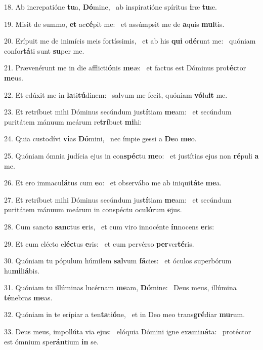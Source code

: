 18. Ab increpatióne \textbf{tu}a, \textbf{Dó}mine, \ast\  ab inspiratióne spíritus \textbf{i}ræ \textbf{tu}æ.\

19. Misit de summo, \textbf{et} ac\textbf{cé}pit me: \ast\  et assúmpsit me de \textbf{a}quis \textbf{mul}tis.\

20. Erípuit me de inimícis meis fortíssimis, \dag\  et ab his \textbf{qui} o\textbf{dé}runt me: \ast\  quóniam confor\textbf{tá}ti sunt \textbf{su}per me.\

21. Prævenérunt me in die afflicti\textbf{ó}nis \textbf{me}æ: \ast\  et factus est Dóminus pro\textbf{téc}tor \textbf{me}us.\

22. Et edúxit me in \textbf{la}ti\textbf{tú}dinem: \ast\  salvum me fecit, quóniam \textbf{vó}lu\textbf{it} me.\

23. Et retríbuet mihi Dóminus secúndum jus\textbf{tí}tiam \textbf{me}am: \ast\  et secúndum puritátem mánuum meárum re\textbf{trí}buet \textbf{mi}hi:\

24. Quia custodívi \textbf{vi}as \textbf{Dó}mini, \ast\  nec ímpie gessi a \textbf{De}o \textbf{me}o.\

25. Quóniam ómnia judícia ejus in con\textbf{spéc}tu \textbf{me}o: \ast\  et justítias ejus non \textbf{ré}puli \textbf{a} me.\

26. Et ero immacu\textbf{lá}tus cum \textbf{e}o: \ast\  et observábo me ab iniqui\textbf{tá}te \textbf{me}a.\

27. Et retríbuet mihi Dóminus secúndum jus\textbf{tí}tiam \textbf{me}am: \ast\  et secúndum puritátem mánuum meárum in conspéctu ocu\textbf{ló}rum \textbf{e}jus.\

28. Cum sancto \textbf{sanc}tus \textbf{e}ris, \ast\  et cum viro innocénte \textbf{ín}nocens \textbf{e}ris:\

29. Et cum elécto e\textbf{léc}tus \textbf{e}ris: \ast\  et cum pervérso \textbf{per}ver\textbf{té}ris.\

30. Quóniam tu pópulum húmilem \textbf{sal}vum \textbf{fá}cies: \ast\  et óculos superbórum hu\textbf{mi}li\textbf{á}bis.\

31. Quóniam tu illúminas lucérnam \textbf{me}am, \textbf{Dó}mine: \ast\  Deus meus, illúmina \textbf{té}nebras \textbf{me}as.\

32. Quóniam in te erípiar a ten\textbf{ta}ti\textbf{ó}ne, \ast\  et in Deo meo trans\textbf{gré}diar \textbf{mu}rum.\

33. Deus meus, impollúta via ejus: \dag\  elóquia Dómini igne ex\textbf{a}mi\textbf{ná}ta: \ast\  protéctor est ómnium spe\textbf{rán}tium \textbf{in} se.\

